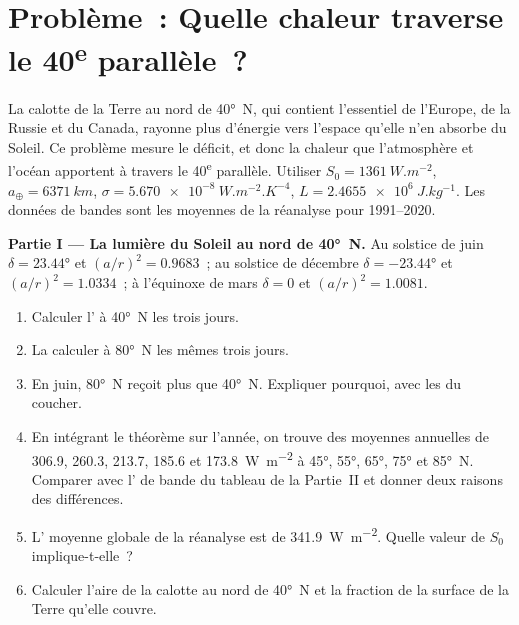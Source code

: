 \section{Problème~: Quelle chaleur traverse le 40\textsuperscript{e} parallèle~?}

\begin{problem}
\label{pb:b1:radiation-heat-transport:1}
La calotte de la Terre au nord de \ang{40}~N, qui contient l'essentiel de l'Europe, de la Russie
et du Canada, rayonne plus d'énergie vers l'espace qu'elle n'en absorbe du
Soleil. Ce problème mesure le déficit, et donc la chaleur que l'atmosphère et
l'océan apportent à travers le 40\textsuperscript{e} parallèle. Utiliser $S_0 = \qty{1361}{W.m^{-2}}$,
$a_\oplus = \qty{6371}{km}$, $\sigma = \qty{5.670e-8}{W.m^{-2}.K^{-4}}$, $L =
\qty{2.4655e6}{J.kg^{-1}}$. Les données de bandes sont les moyennes de la réanalyse pour 1991--2020.

\medskip
\noindent\textbf{Partie I --- La lumière du Soleil au nord de \ang{40}~N.} Au solstice de juin
$\delta = \ang{23.44}$ et $(a/r)^2 = 0.9683$~; au solstice de décembre $\delta =
\ang{-23.44}$ et $(a/r)^2 = 1.0334$~; à l'équinoxe de mars $\delta = 0$ et
$(a/r)^2 = 1.0081$.
\begin{enumerate}
  \item Calculer l' à \ang{40}~N les trois jours.
  \item La calculer à \ang{80}~N les mêmes trois jours.
  \item En juin, \ang{80}~N reçoit plus que \ang{40}~N. Expliquer pourquoi, avec les
         du coucher.
  \item En intégrant le théorème sur l'année, on trouve des moyennes annuelles de
        \qty{306.9}{}, \qty{260.3}{}, \qty{213.7}{}, \qty{185.6}{} et
        \qty{173.8}{W.m^{-2}} à \ang{45}, \ang{55}, \ang{65}, \ang{75} et
        \ang{85}~N. Comparer avec l' de bande du tableau de la Partie~II et
        donner deux raisons des différences.
  \item L' moyenne globale de la réanalyse est de \qty{341.9}{W.m^{-2}}. Quelle
        valeur de $S_0$ implique-t-elle~?
  \item Calculer l'aire de la calotte au nord de \ang{40}~N et la fraction de la
        surface de la Terre qu'elle couvre.
\end{enumerate}


\end{problem}
